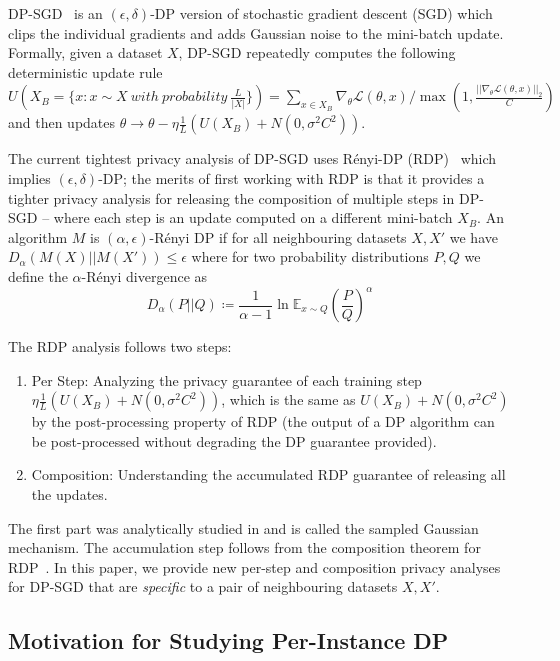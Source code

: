 DP-SGD~\citep{abadi2016deep,bassily2014private, song2013stochastic} is an $(\epsilon,\delta)$-DP version of stochastic gradient descent (SGD) which clips the individual gradients and adds Gaussian noise to the mini-batch update. Formally, given a dataset $X$, DP-SGD repeatedly computes the following deterministic update rule $U(X_{B} = \{x: x \sim X~with~probability~\frac{L}{|X|}\}) = \sum_{x \in X_B} \nabla_{\theta}\mathcal{L}(\theta,x)/ \max(1,\frac{||\nabla_{\theta}\mathcal{L}(\theta,x)||_2}{C})$ and then updates $\theta  \rightarrow \theta - \eta \frac{1}{L}(U(X_B) + N(0,\sigma^2 C^2))$.

The current tightest privacy analysis of DP-SGD uses R\'enyi-DP (RDP)~\citep{mironov2017renyi} which implies $(\epsilon,\delta)$-DP; the merits of first working with RDP is that it provides a tighter privacy analysis for releasing the composition of multiple steps in DP-SGD -- where each step is an update computed on a different mini-batch $X_B$. An algorithm $M$ is $(\alpha,\epsilon)$-R\'enyi DP if for all neighbouring datasets $X, X'$ we have
$D_{\alpha}(M(X)|| M(X')) \leq \epsilon$
where for two probability distributions $P,Q$ we define the $\alpha$-R\'enyi divergence as $$D_{\alpha}(P||Q) \coloneqq \frac{1}{\alpha -1} \ln \mathbb{E}_{x \sim Q} (\frac{P}{Q})^{\alpha}$$


The RDP analysis follows two steps:

\begin{enumerate}[leftmargin=*,noitemsep,topsep=0pt]
    \item Per Step: Analyzing the privacy guarantee of each training step $\eta \frac{1}{L}(U(X_B) + N(0,\sigma^2 C^2))$, which is the same as $U(X_B) + N(0,\sigma^2 C^2)$ by the post-processing property of RDP (the output of a DP algorithm can be post-processed without degrading the DP guarantee provided). 
    \item Composition: Understanding the accumulated RDP guarantee of releasing all the updates. 
\end{enumerate}


The first part was analytically studied in \citet{mironov2019r} and is called the sampled Gaussian mechanism. The accumulation step follows from the composition theorem for RDP~\citep{mironov2017renyi}. In this paper, we provide new per-step and composition privacy analyses for DP-SGD that are \emph{specific} to a pair of neighbouring datasets $X,X'$.



\subsection{Motivation for Studying Per-Instance DP} 
\label{ssec:per-instance_back}



